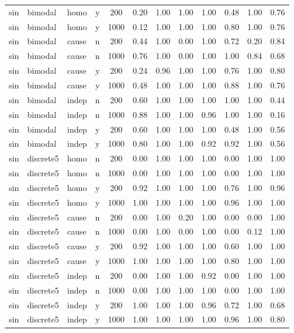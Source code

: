 \begin{longtable}{@{}lllccccccccc@{}}
sin & bimodal & homo & y & 200 & 0.20 & 1.00 & 1.00 & 1.00 & 0.48 & 1.00 & 0.76\\
sin & bimodal & homo & y & 1000 & 0.12 & 1.00 & 1.00 & 1.00 & 0.80 & 1.00 & 0.76\\
sin & bimodal & cause & n & 200 & 0.44 & 1.00 & 0.00 & 1.00 & 0.72 & 0.20 & 0.84\\
sin & bimodal & cause & n & 1000 & 0.76 & 1.00 & 0.00 & 1.00 & 1.00 & 0.84 & 0.68\\
sin & bimodal & cause & y & 200 & 0.24 & 0.96 & 1.00 & 1.00 & 0.76 & 1.00 & 0.80\\
sin & bimodal & cause & y & 1000 & 0.48 & 1.00 & 1.00 & 1.00 & 0.88 & 1.00 & 0.76\\
sin & bimodal & indep & n & 200 & 0.60 & 1.00 & 1.00 & 1.00 & 1.00 & 1.00 & 0.44\\
sin & bimodal & indep & n & 1000 & 0.88 & 1.00 & 1.00 & 0.96 & 1.00 & 1.00 & 0.16\\
sin & bimodal & indep & y & 200 & 0.60 & 1.00 & 1.00 & 1.00 & 0.48 & 1.00 & 0.56\\
sin & bimodal & indep & y & 1000 & 0.80 & 1.00 & 1.00 & 0.92 & 0.92 & 1.00 & 0.56\\
sin & discrete5 & homo & n & 200 & 0.00 & 1.00 & 1.00 & 1.00 & 0.00 & 1.00 & 1.00\\
sin & discrete5 & homo & n & 1000 & 0.00 & 1.00 & 1.00 & 1.00 & 0.00 & 1.00 & 1.00\\
sin & discrete5 & homo & y & 200 & 0.92 & 1.00 & 1.00 & 1.00 & 0.76 & 1.00 & 0.96\\
sin & discrete5 & homo & y & 1000 & 1.00 & 1.00 & 1.00 & 1.00 & 0.96 & 1.00 & 1.00\\
sin & discrete5 & cause & n & 200 & 0.00 & 1.00 & 0.20 & 1.00 & 0.00 & 0.00 & 1.00\\
sin & discrete5 & cause & n & 1000 & 0.00 & 1.00 & 0.00 & 1.00 & 0.00 & 0.12 & 1.00\\
sin & discrete5 & cause & y & 200 & 0.92 & 1.00 & 1.00 & 1.00 & 0.60 & 1.00 & 1.00\\
sin & discrete5 & cause & y & 1000 & 1.00 & 1.00 & 1.00 & 1.00 & 0.80 & 1.00 & 1.00\\
sin & discrete5 & indep & n & 200 & 0.00 & 1.00 & 1.00 & 0.92 & 0.00 & 1.00 & 1.00\\
sin & discrete5 & indep & n & 1000 & 0.00 & 1.00 & 1.00 & 1.00 & 0.00 & 1.00 & 1.00\\
sin & discrete5 & indep & y & 200 & 1.00 & 1.00 & 1.00 & 0.96 & 0.72 & 1.00 & 0.68\\
sin & discrete5 & indep & y & 1000 & 1.00 & 1.00 & 1.00 & 1.00 & 0.96 & 1.00 & 0.80\\
\bottomrule
\end{longtable}
\endgroup

